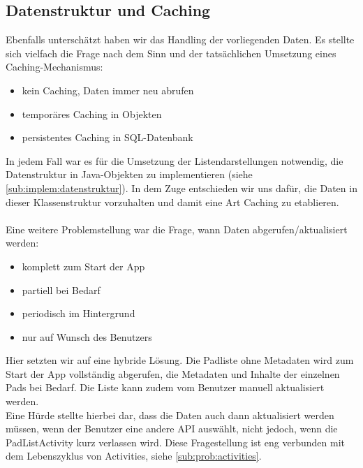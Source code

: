 \subsection{Datenstruktur und Caching}
Ebenfalls unterschätzt haben wir das Handling der vorliegenden Daten.
Es stellte sich vielfach die Frage nach dem Sinn und der tatsächlichen Umsetzung eines Caching-Mechanismus:
\begin{itemize}
	\item kein Caching, Daten immer neu abrufen
	\item temporäres Caching in Objekten
	\item persistentes Caching in SQL-Datenbank
\end{itemize}

In jedem Fall war es für die Umsetzung der Listendarstellungen notwendig, die Datenstruktur in Java-Objekten zu implementieren (siehe \autoref{sub:implem:datenstruktur}).
In dem Zuge entschieden wir uns dafür, die Daten in dieser Klassenstruktur vorzuhalten und damit eine Art Caching zu etablieren.\\
\\
Eine weitere Problemstellung war die Frage, wann Daten abgerufen/aktualisiert werden:
\begin{itemize}
	\item komplett zum Start der App
	\item partiell bei Bedarf
	\item periodisch im Hintergrund
	\item nur auf Wunsch des Benutzers
\end{itemize}

Hier setzten wir auf eine hybride Lösung.
Die Padliste ohne Metadaten wird zum Start der App vollständig abgerufen, die Metadaten und Inhalte der einzelnen Pads bei Bedarf.
Die Liste kann zudem vom Benutzer manuell aktualisiert werden.\\
Eine Hürde stellte hierbei dar, dass die Daten auch dann aktualisiert werden müssen, wenn der Benutzer eine andere API auswählt, nicht jedoch, wenn die PadListActivity kurz verlassen wird.
Diese Fragestellung ist eng verbunden mit dem Lebenszyklus von Activities, siehe \autoref{sub:prob:activities}.


